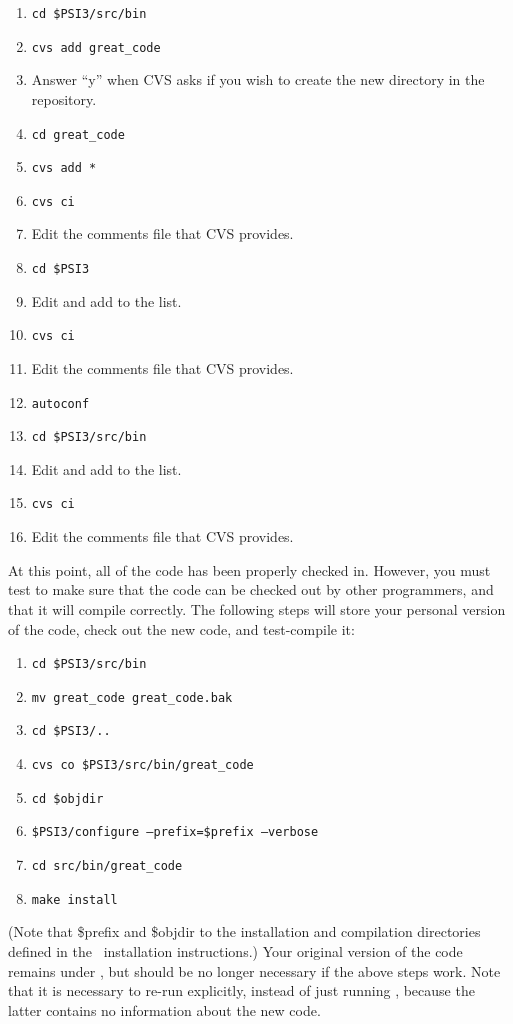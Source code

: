 \begin{enumerate}
\item {\tt cd \$PSI3/src/bin}
\item {\tt cvs add great\_code}
\item Answer ``y'' when CVS asks if you wish to create the new directory in
      the repository. 
\item {\tt cd great\_code}
\item {\tt cvs add *}
\item {\tt cvs ci}
\item Edit the comments file that CVS provides. 
\item {\tt cd \$PSI3}
\item Edit  and add  to the list. 
\item {\tt cvs ci}
\item Edit the comments file that CVS provides. 
\item {\tt autoconf} 
\item {\tt cd \$PSI3/src/bin} 
\item Edit  and add  to the list. 
\item {\tt cvs ci}
\item Edit the comments file that CVS provides. 
\end{enumerate}
At this point, all of the code has been properly checked in. However, you must
test to make sure that the code can be checked out by other programmers, and
that it will compile correctly. The following steps 
will store your personal version of the code, check out the new code, and
test-compile it:
\begin{enumerate}
\item {\tt cd \$PSI3/src/bin}
\item {\tt mv great\_code great\_code.bak}
\item {\tt cd \$PSI3/..}
\item {\tt cvs co \$PSI3/src/bin/great\_code}
\item {\tt cd \$objdir}
\item {\tt \$PSI3/configure --prefix=\$prefix --verbose}
\item {\tt cd src/bin/great\_code}
\item {\tt make install}
\end{enumerate}
(Note that \$prefix and \$objdir to the installation and compilation
 directories defined in the \PSIthree\ installation instructions.)
Your original version of the code remains under ,
but should be no longer necessary if the above steps work. Note that it is
necessary to re-run  explicitly, instead of just running
, because the latter contains no information about
the new code.


